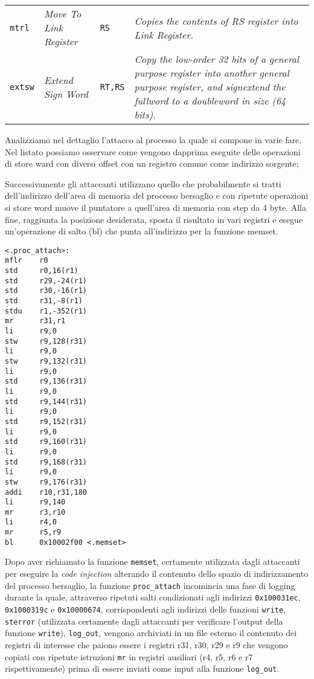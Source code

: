\documentclass[10pt,a4paper, titlepage]{report}
\begin{document}
\begin{table}[h!]
\begin{center}
\begin{adjustbox}{center=\textwidth}
\begin{tabular}{l|l|l|p{6cm}}
	       	\texttt{mtrl} & \textit{Move To Link Register} & \texttt{RS} & \textit{Copies the contents of RS register into Link Register.} \\

\texttt{extsw} & \textit{Extend Sign Word} & \texttt{RT,RS} & \textit{Copy the low-order 32 bits of a general purpose register into another general purpose register, and signextend the fullword to a doubleword in size (64 bits).} \\
	       	
	      \bottomrule
	    \end{tabular}
	       \end{adjustbox}
	  \end{center}
	\end{table}


Analizziamo nel dettaglio l'attacco al processo la quale si compone in varie fare.
Nel listato possiamo osservare come vengono dapprima eseguite delle operazioni di store ward con diversi offset con un registro comune come indirizzo sorgente; 

Successivamente gli attaccanti utilizzano quello che probabilmente si tratti dell'indirizzo dell'area di memoria del processo bersaglio e con ripetute operazioni si store word muove il puntatore a quell'area di memoria con step da 4 byte. Alla fine, raggiunta la posizione desiderata, sposta il risultato in vari registri e esegue un'operazione di salto (bl) che punta all'indirizzo per la funzione memset.

\begin{lstlisting}
<.proc_attach>:
mflr    r0
std     r0,16(r1)
std     r29,-24(r1)
std     r30,-16(r1)
std     r31,-8(r1)
stdu    r1,-352(r1)
mr      r31,r1
li      r9,0
stw     r9,128(r31)
li      r9,0
stw     r9,132(r31)
li      r9,0
std     r9,136(r31)
li      r9,0
std     r9,144(r31)
li      r9,0
std     r9,152(r31)
li      r9,0
std     r9,160(r31)
li      r9,0
std     r9,168(r31)
li      r9,0
stw     r9,176(r31)
addi    r10,r31,180
li      r9,140
mr      r3,r10
li      r4,0
mr      r5,r9
bl      0x10002f00 <.memset>
\end{lstlisting}

Dopo aver richiamato la funzione \texttt{memset}, certamente utilizzata dagli attaccanti per eseguire la \textit{code injection} alterando il contenuto dello spazio di indirizzamento del processo bersaglio, la funzione \texttt{proc\_attach} incomincia una fase di logging durante la quale, attraverso ripetuti salti condizionati agli indirizzi \texttt{0x100031ec}, \texttt{0x1000319c} e \texttt{0x10000674}, corrispondenti agli indirizzi delle funzioni \texttt{write}, \texttt{sterror} (utilizzata certamente dagli attaccanti per verificare l'output della funzione \texttt{write}), \texttt{log\_out}, vengono archiviati in un file esterno il contenuto dei registri di interesse che paiono essere i registri r31, r30, r29 e r9 che vengono copiati con ripetute istruzioni \texttt{mr} in registri ausiliari (r4, r5, r6 e r7 rispettivamente) prima di essere inviati come input alla funzione \texttt{log\_out}.
\end{document}
